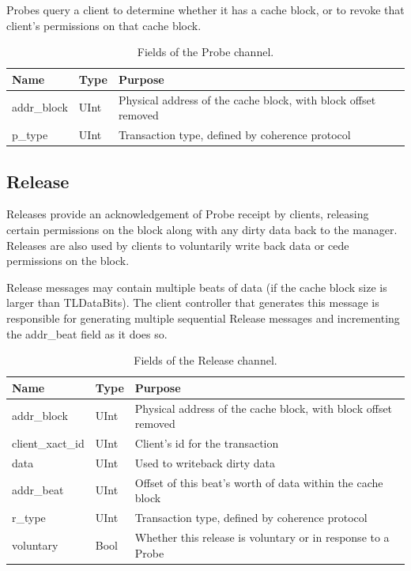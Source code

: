 Probes query a client to determine whether it has a cache block, or to revoke that client's  permissions on that cache block.

\begin{table}[ht]
\begin{center}
\begin{tabular}{|l|l|l|}
    \hline
    Name & Type & Purpose \\ \hline \hline
addr\_block & UInt & Physical address of the cache block, with block offset removed \\ \hline
p\_type & UInt & Transaction type, defined by coherence protocol \\ \hline
\end{tabular}
\end{center}
\caption{Fields of the Probe channel.}
\label{tab:probe}
\end{table}


\subsection{Release}

Releases provide an acknowledgement of Probe receipt by clients, releasing certain permissions on the block along with any dirty data back to the manager.
Releases are also used by clients to voluntarily write back data or cede permissions on the block.

Release messages may contain multiple beats of data (if the cache block size is larger than TLDataBits).
The client controller that generates this message is responsible for generating multiple sequential Release messages and incrementing the addr\_beat field as it does so.

\begin{table}[ht]
\begin{center}
\begin{tabular}{|l|l|l|}
    \hline
    Name & Type & Purpose \\ \hline \hline
addr\_block & UInt & Physical address of the cache block, with block offset removed \\ \hline
client\_xact\_id & UInt & Client's id for the transaction \\ \hline
data & UInt & Used to writeback dirty data \\ \hline
addr\_beat & UInt & Offset of this beat's worth of data within the cache block \\ \hline
r\_type & UInt & Transaction type, defined by coherence protocol \\ \hline
voluntary & Bool & Whether this release is voluntary or in response to a Probe \\ \hline
\end{tabular}
\end{center}
\caption{Fields of the Release channel.}
\label{tab:release}
\end{table}

